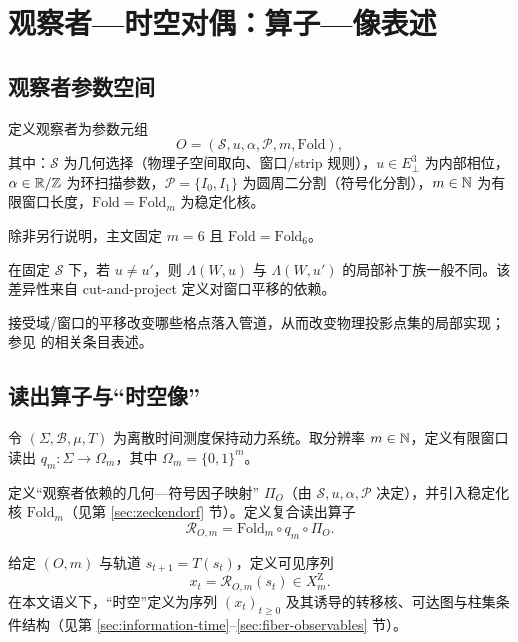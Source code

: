 \section{观察者—时空对偶：算子—像表述}

\subsection{观察者参数空间}

\begin{definition}[观察者参数]\label{def:observer}
定义观察者为参数元组
\[
O=(\mathcal{S},u,\alpha,\mathcal{P},m,\mathrm{Fold}),
\]
其中：$\mathcal{S}$ 为几何选择（物理子空间取向、窗口/strip 规则），$u\in E_{\perp}^{3}$ 为内部相位，$\alpha\in\mathbb{R}/\mathbb{Z}$ 为环扫描参数，$\mathcal{P}=\{I_0,I_1\}$ 为圆周二分割（符号化分割），$m\in\mathbb{N}$ 为有限窗口长度，$\mathrm{Fold}=\mathrm{Fold}_m$ 为稳定化核。
\end{definition}

\begin{assumption}[主文固定带宽]\label{assump:m6-fixed-main}
除非另行说明，主文固定 $m=6$ 且 $\mathrm{Fold}=\mathrm{Fold}_6$。
\end{assumption}

\begin{proposition}[局部实现差异]\label{prop:patch-difference}
在固定 $\mathcal{S}$ 下，若 $u\neq u'$，则 $\Lambda(W,u)$ 与 $\Lambda(W,u')$ 的局部补丁族一般不同。该差异性来自 cut-and-project 定义对窗口平移的依赖。
\end{proposition}

\begin{remark}
接受域/窗口的平移改变哪些格点落入管道，从而改变物理投影点集的局部实现；参见 \cite{IUCRAcceptanceDomain} 的相关条目表述。
\end{remark}

\subsection{读出算子与“时空像”}

令 $(\Sigma,\mathcal{B},\mu,T)$ 为离散时间测度保持动力系统。取分辨率 $m\in\mathbb{N}$，定义有限窗口读出 $q_m:\Sigma\to\Omega_m$，其中 $\Omega_m=\{0,1\}^{m}$。

定义“观察者依赖的几何—符号因子映射” $\Pi_O$（由 $\mathcal{S},u,\alpha,\mathcal{P}$ 决定），并引入稳定化核 $\mathrm{Fold}_m$（见第 \ref{sec:zeckendorf} 节）。定义复合读出算子
\[
\mathcal{R}_{O,m}=\mathrm{Fold}_m\circ q_m\circ \Pi_O.
\]

\begin{definition}[时空像]\label{def:spacetime-image}
给定 $(O,m)$ 与轨道 $s_{t+1}=T(s_t)$，定义可见序列
\[
x_t=\mathcal{R}_{O,m}(s_t)\in X_m^{\mathrm Z}.
\]
在本文语义下，“时空”定义为序列 $(x_t)_{t\ge 0}$ 及其诱导的转移核、可达图与柱集条件结构（见第 \ref{sec:information-time}--\ref{sec:fiber-observables} 节）。
\end{definition}

